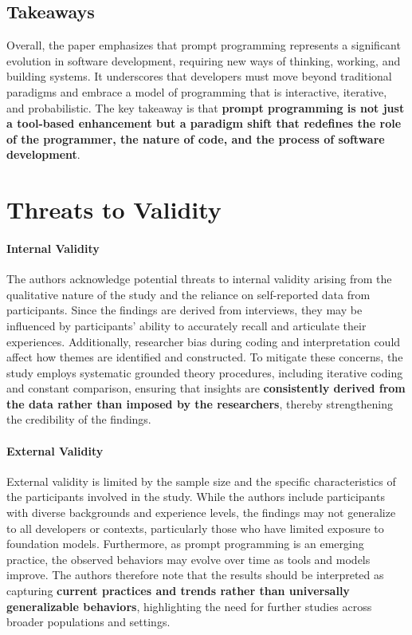 \subsection{Takeaways}
Overall, the paper emphasizes that prompt programming represents a significant evolution in software development, requiring new ways of thinking, working, and building systems. It underscores that developers must move beyond traditional paradigms and embrace a model of programming that is interactive, iterative, and probabilistic. The key takeaway is that \textbf{prompt programming is not just a tool-based enhancement but a paradigm shift that redefines the role of the programmer, the nature of code, and the process of software development}.

\section{Threats to Validity}
\paragraph{Internal Validity}
The authors acknowledge potential threats to internal validity arising from the qualitative nature of the study and the reliance on self-reported data from participants. Since the findings are derived from interviews, they may be influenced by participants’ ability to accurately recall and articulate their experiences. Additionally, researcher bias during coding and interpretation could affect how themes are identified and constructed. To mitigate these concerns, the study employs systematic grounded theory procedures, including iterative coding and constant comparison, ensuring that insights are \textbf{consistently derived from the data rather than imposed by the researchers}, thereby strengthening the credibility of the findings.

\paragraph{External Validity}
External validity is limited by the sample size and the specific characteristics of the participants involved in the study. While the authors include participants with diverse backgrounds and experience levels, the findings may not generalize to all developers or contexts, particularly those who have limited exposure to foundation models. Furthermore, as prompt programming is an emerging practice, the observed behaviors may evolve over time as tools and models improve. The authors therefore note that the results should be interpreted as capturing \textbf{current practices and trends rather than universally generalizable behaviors}, highlighting the need for further studies across broader populations and settings.

